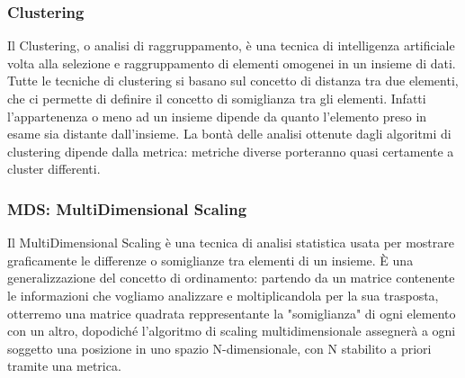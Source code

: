 			\subsubsection{Clustering}
				Il Clustering, o analisi di raggruppamento, è una tecnica di intelligenza artificiale volta alla selezione e raggruppamento di elementi omogenei in un insieme di dati. Tutte le tecniche di clustering si basano sul concetto di distanza tra due elementi, che ci permette di definire il concetto di somiglianza tra gli elementi. Infatti l'appartenenza o meno ad un insieme dipende da quanto l'elemento preso in esame sia distante dall'insieme. La bontà delle analisi ottenute dagli algoritmi di clustering dipende dalla metrica: metriche diverse porteranno quasi certamente a cluster differenti.
				
			\subsubsection{MDS: MultiDimensional Scaling}
				Il MultiDimensional Scaling è una tecnica di analisi statistica usata per mostrare graficamente le differenze o somiglianze tra elementi di un insieme. È una generalizzazione del concetto di ordinamento: partendo da un matrice contenente le informazioni che vogliamo analizzare e moltiplicandola per la sua trasposta, otterremo una matrice quadrata reppresentante la "somiglianza"  di ogni elemento con un altro, dopodiché l'algoritmo di scaling multidimensionale assegnerà a ogni soggetto una posizione in uno spazio N-dimensionale, con N stabilito a priori tramite una metrica.

